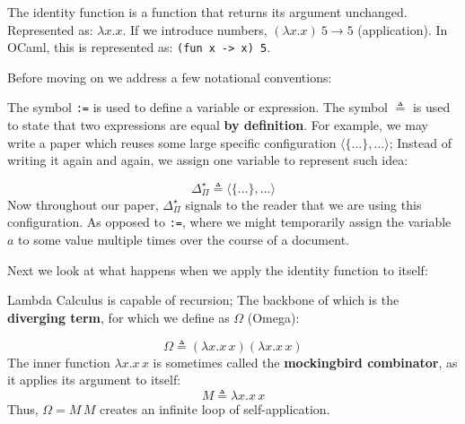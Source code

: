  \begin{Def}

    \label{def:identity-func}
    The identity function is a function that returns its argument unchanged. Represented as:
    $
    \lambda x. x
    $.
    \noindent
    If we introduce numbers,
    $
    (\lambda x. x)\ 5 \rightarrow 5
    $ (application).
    \noindent
    In OCaml, this is represented as: \texttt{(fun x -> x) 5}.
  \end{Def}

  \newpage 

\noindent
Before moving on we address a few notational conventions:
\begin{Def}[Symbols $\triangleq$ vs. :=]

    The symbol \texttt{:=} is used to define a variable or expression.  
    The symbol $\triangleq$ is used to state that two expressions are equal \textbf{by definition}.
    For example, we may write a paper which reuses some large specific configuration $\langle\{\dots\}, \dots  \rangle$; Instead of 
    writing it again and again, we assign one variable to represent such idea:
    
    \Large
    \[
    \Delta^{\star}_{\Pi}   \triangleq \langle\{\dots\}, \dots  \rangle
    \]
    \normalsize
    Now throughout our paper, $\Delta^{\star}_{\Pi}$ signals to the reader that we are using this configuration.
    As opposed to \texttt{:=}, where we might temporarily assign the variable $a$ to some value multiple times over 
    the course of a document.
    \end{Def}
    
\noindent
Next we look at what happens when we apply the identity function to itself:

\begin{Def}

    Lambda Calculus is capable of recursion; The backbone of which is the \textbf{diverging term},
    for which we define as $\Omega$ (Omega):

    \Large
    \[
      \Omega\triangleq (\lambda x. x\,x)(\lambda x. x\,x)
    \]
    \normalsize
    \noindent    
    The inner function \(\lambda x. x\,x\) is sometimes called the \textbf{mockingbird combinator}, as it applies its argument to itself:
    \Large
    \[
      M \triangleq \lambda x. x\,x
    \]
    \normalsize
    Thus, \(\Omega = M\,M\) creates an infinite loop of self-application.
  \end{Def}

